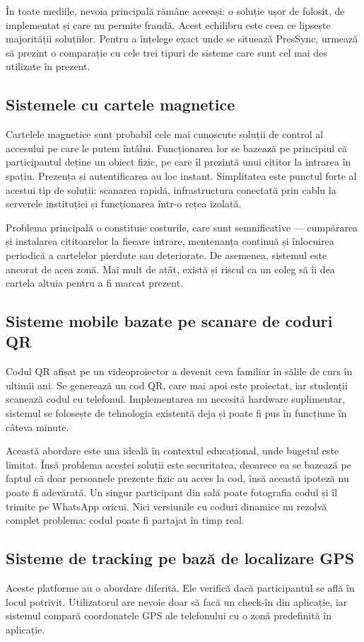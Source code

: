 \documentclass[a4paper,12pt,oneside]{report}
\begin{document}
În toate mediile, nevoia principală rămâne aceeași: o soluție ușor de folosit, de implementat și care nu permite fraudă. Acest echilibru este ceea ce lipsește majorității soluțiilor.
Pentru a înțelege exact unde se situează PresSync, urmează să prezint o comparație cu cele trei tipuri de sisteme care sunt cel mai des utilizate în prezent.
\subsection{Sistemele cu cartele magnetice}

Cartelele magnetice sunt probabil cele mai cunoscute soluții de control al accesului pe care le putem întâlni. Funcționarea lor se bazează pe principiul că participantul deține un obiect fizic, pe care îl prezintă unui cititor la intrarea în spațiu. Prezența și autentificarea au loc instant. Simplitatea este punctul forte al acestui tip de soluții: scanarea rapidă, infrastructura conectată prin cablu la serverele instituției și funcționarea într-o rețea izolată.

Problema principală o constituie costurile, care sunt semnificative — cumpărarea și instalarea cititoarelor la fiecare intrare, mentenanța continuă și înlocuirea periodică a cartelelor pierdute sau deteriorate. De asemenea, sistemul este ancorat de acea zonă. Mai mult de atât, există și riscul ca un coleg să îi dea cartela altuia pentru a fi marcat prezent.

\subsection{Sisteme mobile bazate pe scanare de coduri QR}
Codul QR afișat pe un videoproiector a devenit ceva familiar în sălile de curs în ultimii ani. Se generează un cod QR, care mai apoi este proiectat, iar studenții scanează codul cu telefonul.
Implementarea nu necesită hardware suplimentar, sistemul se folosește de tehnologia existentă deja și poate fi pus în funcțiune în câteva minute.

Această abordare este una ideală în contextul educațional, unde bugetul este limitat. Însă problema acestei soluții este securitatea, deoarece ea se bazează pe faptul că doar persoanele prezente fizic au acces la cod, însă această ipoteză nu poate fi adevărată. Un singur participant din sală poate fotografia codul și îl trimite pe WhatsApp oricui. Nici versiunile cu coduri dinamice nu rezolvă complet problema: codul poate fi partajat în timp real.
\subsection{Sisteme de tracking pe bază de localizare GPS}
Aceste platforme au o abordare diferită. Ele verifică dacă participantul se află în locul potrivit. Utilizatorul are nevoie doar să facă un check-în din aplicație, iar sistemul compară coordonatele GPS ale telefonului cu o zonă predefinită în aplicație.
\end{document}
